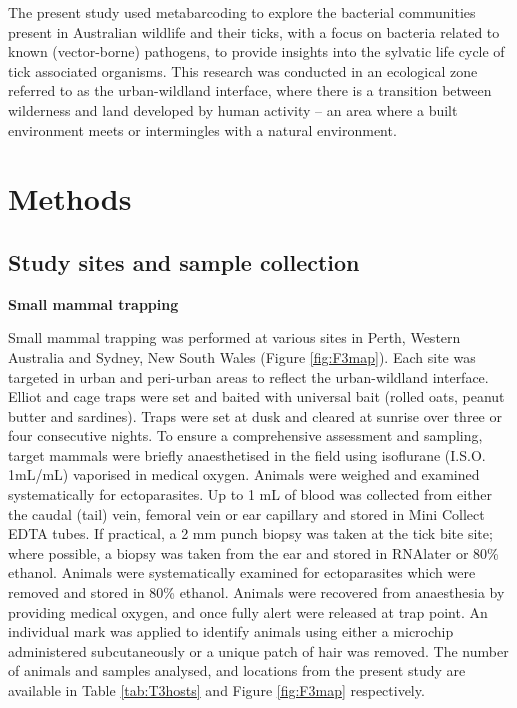 \documentclass[a4paper, nobind]{templates/ociamthesis}
\begin{document}
The present study used metabarcoding to explore the bacterial communities present in Australian wildlife and their ticks, with a focus on bacteria related to known (vector-borne) pathogens, to provide insights into the sylvatic life cycle of tick associated organisms.
This research was conducted in an ecological zone referred to as the urban-wildland interface, where there is a transition between wilderness and land developed by human activity -- an area where a built environment meets or intermingles with a natural environment.

\hypertarget{methods-1}{%
\section{Methods}\label{methods-1}}

\hypertarget{study-sites-and-sample-collection}{%
\subsection{Study sites and sample collection}\label{study-sites-and-sample-collection}}

\textbf{Small mammal trapping}

Small mammal trapping was performed at various sites in Perth, Western Australia and Sydney, New South Wales (Figure \ref{fig:F3map}).
Each site was targeted in urban and peri-urban areas to reflect the urban-wildland interface.
Elliot and cage traps were set and baited with universal bait (rolled oats, peanut butter and sardines).
Traps were set at dusk and cleared at sunrise over three or four consecutive nights. To ensure a comprehensive assessment and sampling, target mammals were briefly anaesthetised in the field using isoflurane (I.S.O. 1mL/mL) vaporised in medical oxygen.
Animals were weighed and examined systematically for ectoparasites.
Up to 1 mL of blood was collected from either the caudal (tail) vein, femoral vein or ear capillary and stored in Mini Collect EDTA tubes.
If practical, a 2 mm punch biopsy was taken at the tick bite site; where possible, a biopsy was taken from the ear and stored in RNAlater or 80\% ethanol.
Animals were systematically examined for ectoparasites which were removed and stored in 80\% ethanol.
Animals were recovered from anaesthesia by providing medical oxygen, and once fully alert were released at trap point.
An individual mark was applied to identify animals using either a microchip administered subcutaneously or a unique patch of hair was removed.
The number of animals and samples analysed, and locations from the present study are available in Table \ref{tab:T3hosts} and Figure \ref{fig:F3map} respectively.
\end{document}

